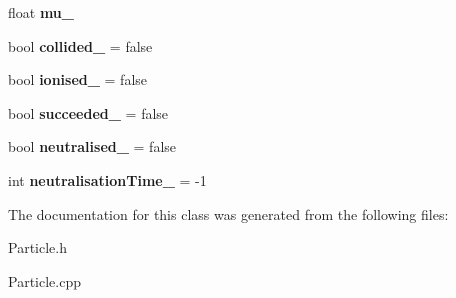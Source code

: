 \begin{DoxyCompactItemize}
\item 
\hypertarget{classParticle_ac4ceb51e8a19079e19e11051976dadab}{float {\bfseries mu\+\_\+}}\label{classParticle_ac4ceb51e8a19079e19e11051976dadab}

\item 
\hypertarget{classParticle_aea34c5bf9db53555170ec1be7530553c}{bool {\bfseries collided\+\_\+} = false}\label{classParticle_aea34c5bf9db53555170ec1be7530553c}

\item 
\hypertarget{classParticle_a73029669f3fda5b9cc1e5a47be6a1994}{bool {\bfseries ionised\+\_\+} = false}\label{classParticle_a73029669f3fda5b9cc1e5a47be6a1994}

\item 
\hypertarget{classParticle_a42766c7655424a9d1c1b010eb12f224f}{bool {\bfseries succeeded\+\_\+} = false}\label{classParticle_a42766c7655424a9d1c1b010eb12f224f}

\item 
\hypertarget{classParticle_a38f8d36be6d63d90e668bbb7b111a075}{bool {\bfseries neutralised\+\_\+} = false}\label{classParticle_a38f8d36be6d63d90e668bbb7b111a075}

\item 
\hypertarget{classParticle_a41eca089f476475b2fb7b7372d6a4d4d}{int {\bfseries neutralisation\+Time\+\_\+} = -\/1}\label{classParticle_a41eca089f476475b2fb7b7372d6a4d4d}

\end{DoxyCompactItemize}


The documentation for this class was generated from the following files\+:\begin{DoxyCompactItemize}
\item 
Particle.\+h\item 
Particle.\+cpp\end{DoxyCompactItemize}
